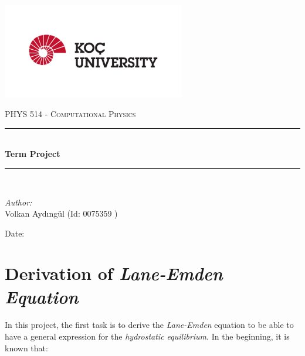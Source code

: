 \documentclass[letterpaper,12pt]{article}
\newcommand{\reporttitle}{Term Project}
\newcommand{\reportauthor}{ Volkan Aydıngül (Id: 0075359 )\\
                            }
\begin{document}
\begin{titlepage}
\newcommand{\HRule}{\rule{0.7\linewidth}{0.5mm}}
\begin{center} %
\includegraphics[width = 8cm]{figures/koc_logo.png}

\textsc{\Large PHYS 514 - Computational Physics}\\[1.5cm] 
\HRule \\[0.6cm]
{ \huge \bfseries \reporttitle}\\ %
\HRule \\[1.5cm]
\end{center}
\vspace{2cm}
\begin{flushleft} \large
\textit{Author:}\\
\reportauthor%
\end{flushleft}
\vspace{2cm}
\makeatletter
Date: \@date 
\vfill %
\makeatother
\end{titlepage}




\tableofcontents
\newpage





\section{Derivation of \textit{Lane-Emden Equation}}

\paragraph{} In this project, the first task is to derive the \textit{Lane-Emden} equation to be able to have a general expression for the \textit{hydrostatic equilibrium}. In the beginning, it is known that:
\end{document}
